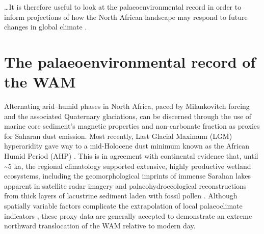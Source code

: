 \documentclass[a4paper]{article}
\begin{document}
% 
\ldots It is therefore useful to look at the palaeoenvironmental record in order to inform projections of how the North African landscape may respond to future changes in global climate \parencite{mohtadi2016palaeoclimatic}.

\section{The palaeoenvironmental record of the WAM}

Alternating arid--humid phases in North Africa, paced by Milankovitch forcing and the associated Quaternary glaciations, can be discerned through the use of marine core sediment's magnetic properties \parencite{bloemendal1989evidence, larrasoana2003three} and non-carbonate fraction \parencite{tiedemann1989climatic, tiedemann1994astronomic} as proxies for Saharan dust emission.
Most recently, Last Glacial Maximum (LGM) hyperaridity gave way to a mid-Holocene dust minimum known as the African Humid Period (AHP) \parencite{rea1994paleoclimatic, demenocal2000abrupt, adkins2006african}.
This is in agreement with continental evidence that, until \textasciitilde 5 ka, the regional climatology supported extensive, highly productive wetland ecosystems, including the geomorphological imprints of immense Sarahan lakes apparent in satellite radar imagery \parencite{schuster2005holocene, drake2006shorelines} and palaeohydroecological reconstructions from thick layers of lacustrine sediment laden with fossil pollen \parencite{ritchie1985sediment, lezine1990across, jolly1998biome}. 
Although spatially variable factors complicate the extrapolation of local palaeoclimate indicators \parencite{baumhauer1991palaeolakes}, these proxy data are generally accepted to demonstrate an extreme northward translocation of the WAM relative to modern day.
\end{document}
